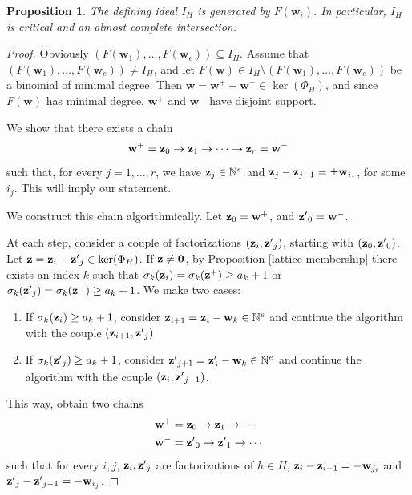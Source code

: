 \documentclass[11pt,twoside]{amsart}
\newcommand{\N}{\mathbb N}
\def\bw{{\mathbf w}}
\newtheorem{prop}[Theorem]{Proposition}
\theoremstyle{definition}
\numberwithin{equation}{section}
\begin{document}
\begin{prop}\label{defidealw_i}
The defining ideal $I_H$ is generated by $F(\bw_i)$. In particular, $I_H$ is critical and an almost complete intersection.
\end{prop}

\begin{proof}
Obviously $(F(\bw_1),\ldots,F(\bw_e)) \subseteq I_H$. 
Assume that $(F(\bw_1),\ldots,F(\bw_e)) \neq I_H$, and let $F(\bw) \in I_H \setminus (F(\bw_1),\ldots,F(\bw_e))$ be a binomial of minimal degree. 
Then $\bw = \bw^+-\bw^- \in \ker(\Phi_H)$, and since $F(\bw)$ has minimal degree, $\bw^+$ and $\bw^-$ have disjoint support.

We show that there exists a chain
$$\bw^+ = {\bf z}_0 \rightarrow {\bf z}_1 \rightarrow \cdots \rightarrow {\bf z}_r = \bw^-$$
such that, for every $j=1,\ldots,r$, we have ${\bf z}_j \in \N^e$ and ${\bf z}_j - {\bf z}_{j-1}= \pm \bw_{i_j}$, for some $i_j$. 
This will imply our statement.

We construct this chain algorithmically. 
Let ${\bf z}_0=\bw^+$, and ${\bf z'}_0 = \bw^-$. 

At each step, consider a couple of factorizations $({\bf z}_i,{\bf z'}_j)$, 
starting with $({\bf z}_0,{\bf z'}_0)$. Let ${\bf z}={\bf z}_i-{\bf z'}_j \in \ker(\Phi_H)$. 
If ${\bf z} \ne {\bf 0}$, by Proposition \ref{lattice membership} there exists an index $k$ such that $\sigma_k({\bf z}_i)=\sigma_k({\bf z}^+) \ge a_k+1$ or $\sigma_k({\bf z'}_j)=\sigma_k({\bf z}^-) \ge a_k+1$. We make two cases:
\begin{enumerate}
    \item If $\sigma_k({\bf z}_i) \ge a_k+1$, consider ${\bf z}_{i+1}={\bf z}_i - \bw_k \in \N^e$ and continue the algorithm with the couple $({\bf z}_{i+1},{\bf z'}_j)$

    \item If $\sigma_k({\bf z'}_j) \ge a_k+1$, consider ${\bf z'}_{j+1}={\bf z}'_j - \bw_k \in \N^e$ and continue the algorithm with the couple $({\bf z}_i,{\bf z'}_{j+1})$.
\end{enumerate}
This way, obtain two chains 
\begin{align*}
\bw^+ &= {\bf z}_0 \rightarrow {\bf z}_1 \rightarrow \cdots  \\
\bw^- &= {\bf z'}_0 \rightarrow {\bf z'}_1 \rightarrow \cdots
\end{align*}
such that for every $i,j$, ${\bf z}_i,{\bf z'}_j$ are factorizations of $h \in H$, ${\bf z}_i - {\bf z}_{i-1}= - \bw_{j_i}$ and ${\bf z'}_j - {\bf z'}_{j-1} =  - \bw_{i_j}$.


\end{proof}
\end{document}
